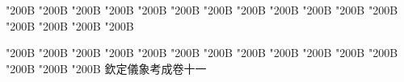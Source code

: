 \begin{正文}
\char"200B\relax{}
\char"200B\relax{}
\char"200B\relax{}
\char"200B\relax{}
\char"200B\relax{}
\char"200B\relax{}
\char"200B\relax{}
\char"200B\relax{}
\char"200B\relax{}
\char"200B\relax{}
\char"200B\relax{}
\char"200B\relax{}
\char"200B\relax{}
\char"200B\relax{}
\char"200B\relax{}
\char"200B\relax
{}\par
\end{正文}\clearpage
{}
\begin{正文}
\char"200B\relax{}
\char"200B\relax{}
\char"200B\relax{}
\char"200B\relax{}
\char"200B\relax{}
\char"200B\relax{}
\char"200B\relax{}
\char"200B\relax{}
\char"200B\relax{}
\char"200B\relax{}
\char"200B\relax{}
\char"200B\relax{}
\char"200B\relax{}
\char"200B\relax{}
\char"200B\relax{}
欽定儀象考成卷十一
\par

\par\end{正文}\clearpage
